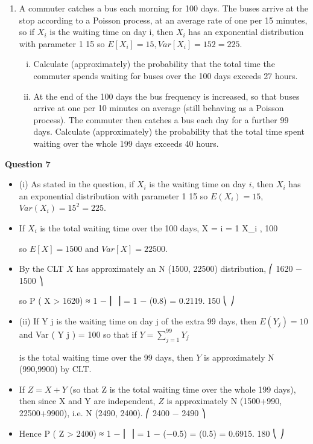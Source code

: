 \documentclass[a4paper,12pt]{article}
\begin{document}
\begin{enumerate}

\item 
A commuter catches a bus each morning for 100 days. The buses arrive at the stop
according to a Poisson process, at an average rate of one per 15 minutes, so if $X_{i}$ is the
waiting time on day i, then $X_{i}$ has an exponential distribution with parameter
1
15
so
$E[X_{i} ] = 15, Var[X_{i} ] = 15 2 = 225.$

\begin{enumerate}[(i)]
\item Calculate (approximately) the probability that the total time the commuter spends waiting for buses over the 100 days exceeds 27 hours.

\item  At the end of the 100 days the bus frequency is increased, so that buses arrive at one per 10 minutes on average (still behaving as a Poisson process). The commuter then catches a bus each day for a further 99 days. Calculate
(approximately) the probability that the total time spent waiting over the
whole 199 days exceeds 40 hours.
\end{enumerate}

\end{enumerate}
\newpage


\noindent \textbf{Question 7}
\begin{itemize}
\item (i)
As stated in the question, if $X_{i}$ is the waiting time on day $i$, then $X_{i}$ has an exponential distribution with parameter
1
15
so $E(X_{i} ) = 15$, $Var(X_{i} ) = 15^2 = 225$.
\item If $X_{i}$ is the total waiting time over the 100 days, X = \sum i = 1 X_{i} ,
100


so $E [ X ] = 1500$ and $Var [ X ] = 22500$. 
\item  By the CLT $X$ has approximately an N (1500, 22500) distribution,
⎛ 1620 − 1500 ⎞

so P ( X > 1620) ≈ 1 − \Phi ⎜
⎟ = 1 − \Phi(0.8) = 0.2119.
150
⎝
⎠
\item (ii)
If Y j is the waiting time on day j of the extra 99 days, then $E ( Y_j ) = 10$ and
Var ( Y j ) = 100 so that if $Y =
\sum^{99}_{j = 1} Y_j$

is the total waiting time over the 99 days,
then $Y$ is approximately N (990,9900) by CLT.
\item If $Z = X + Y$ (so that Z is the total waiting time over the whole 199 days), then
since X and Y are independent, $Z$ is approximately N (1500+990, 22500+9900),
i.e. N (2490, 2400).
⎛ 2400 − 2490 ⎞
\item Hence P ( Z > 2400) ≈ 1 − \Phi ⎜
⎟ = 1 − \Phi(−0.5) = \Phi(0.5) = 0.6915.
180
⎝
⎠
\end{itemize}
\end{document}
